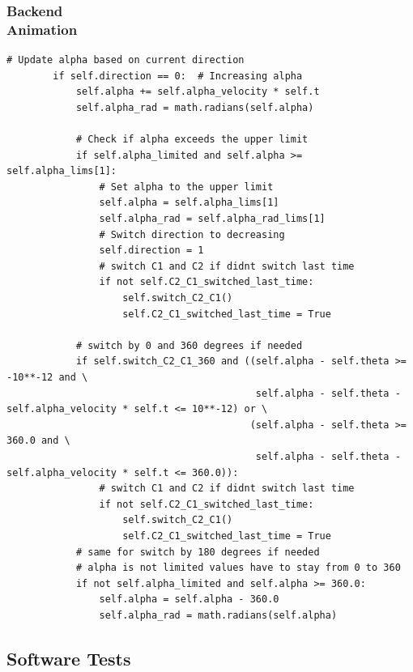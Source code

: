 \documentclass[ucs,10pt]{beamer}
\begin{document}
\begin{frame}[fragile]
\frametitle{Backend \\
	\small \color{rwth-blue} Animation}
	\begin{lstlisting}[basicstyle=\ssmall]
        # Update alpha based on current direction
        if self.direction == 0:  # Increasing alpha
            self.alpha += self.alpha_velocity * self.t
            self.alpha_rad = math.radians(self.alpha)

            # Check if alpha exceeds the upper limit
            if self.alpha_limited and self.alpha >= self.alpha_lims[1]:
                # Set alpha to the upper limit
                self.alpha = self.alpha_lims[1]
                self.alpha_rad = self.alpha_rad_lims[1]
                # Switch direction to decreasing
                self.direction = 1
                # switch C1 and C2 if didnt switch last time
                if not self.C2_C1_switched_last_time:
                    self.switch_C2_C1()
                    self.C2_C1_switched_last_time = True

            # switch by 0 and 360 degrees if needed
            if self.switch_C2_C1_360 and ((self.alpha - self.theta >= -10**-12 and \
                                           self.alpha - self.theta - self.alpha_velocity * self.t <= 10**-12) or \
                                          (self.alpha - self.theta >= 360.0 and \
                                           self.alpha - self.theta - self.alpha_velocity * self.t <= 360.0)):
                # switch C1 and C2 if didnt switch last time
                if not self.C2_C1_switched_last_time:
                    self.switch_C2_C1()
                    self.C2_C1_switched_last_time = True
            # same for switch by 180 degrees if needed
            # alpha is not limited values have to stay from 0 to 360
            if not self.alpha_limited and self.alpha >= 360.0:
                self.alpha = self.alpha - 360.0
                self.alpha_rad = math.radians(self.alpha)
	\end{lstlisting}
\end{frame}

\subsection{Software Tests}
\end{document}
